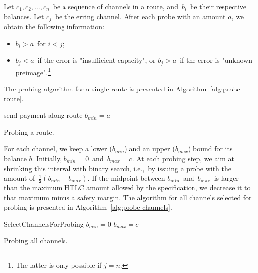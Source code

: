 Let $c_1, c_2, \dots, c_n$~be a sequence of channels in a route, and~$b_i$~be their respective balances.
Let $c_j$~be the erring channel.
After each probe with an amount $a$, we obtain the following information:
\begin{itemize}
	\item $b_i > a$~for $i<j$;
	\item $b_j < a$~if the error is "insufficient capacity", or $b_j > a$~if the error is "unknown preimage".\footnote{The latter is only possible if $j=n$.}
\end{itemize}

The probing algorithm for a single route is presented in Algorithm~\ref{alg:probe-route}.

\begin{algorithm}
	send payment along route\;
	 {
		$b_{min} = a$\;
	}
	\caption{Probing a route.}
	\label{alg:probe-route}
\end{algorithm}


For each channel, we keep a lower ($b_{min}$) and an upper ($b_{max}$) bound for its balance $b$.
Initially, $b_{min}=0$~and~$b_{max}=c$.
At each probing step, we aim at shrinking this interval with binary search, i.e.,~by issuing a probe with the amount of~$\frac{1}{2} (b_{min} + b_{max})$.
If the midpoint between $b_{min}$~and~$b_{max}$~is larger than the maximum HTLC amount allowed by the specification, we decrease it to that maximum minus a safety margin.
The algorithm for all channels selected for probing is presented in Algorithm~\ref{alg:probe-channels}.

\begin{algorithm}
	SelectChannelsForProbing\;
	 {	
		$b_{min} = 0$\;
		$b_{max} = c$\;
		 {
		}
	}
	\caption{Probing all channels.}
	\label{alg:probe-channels}
\end{algorithm}


